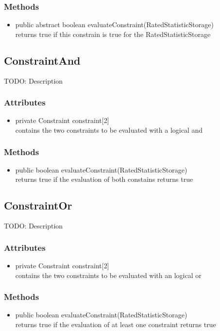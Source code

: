 \subsubsection{Methods}
\begin{itemize}
	\item public abstract boolean evaluateConstraint(RatedStatisticStorage)\\
	returns true if this constrain is true for the RatedStatisticStorage
\end{itemize}


\subsection{ConstraintAnd }
TODO: Description

\subsubsection{Attributes}
\begin{itemize}
	\item private  Constraint constraint[2]\\
	contains the two constraints to be evaluated with a logical and	
\end{itemize}
\subsubsection{Methods}
\begin{itemize}
	\item public boolean evaluateConstraint(RatedStatisticStorage)\\
	returns true if the evaluation of both constains returns true
\end{itemize}


\subsection{ConstraintOr }
TODO: Description

\subsubsection{Attributes}
\begin{itemize}
	\item private Constraint constraint[2]\\
	contains the two constraints to be evaluated with an logical or
\end{itemize}
\subsubsection{Methods}
\begin{itemize}
	\item public boolean evaluateConstraint(RatedStatisticStorage)\\
	returns true if the evaluation of at least one constraint returns true
\end{itemize}


